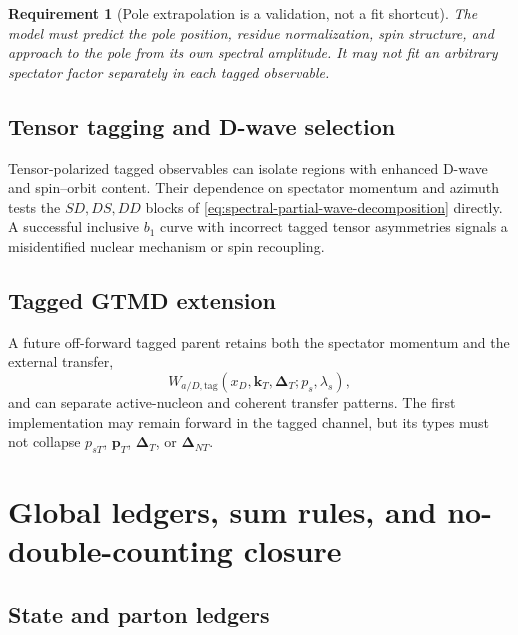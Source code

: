 \documentclass[11pt]{article}
\newtheorem{requirement}[definition]{Requirement}
\newcommand{\kT}{\bm{k}_{T}}
\newcommand{\pT}{\bm{p}_{T}}
\newcommand{\DT}{\bm{\Delta}_{T}}
\newcommand{\DNT}{\bm{\Delta}_{N T}}
\newcommand{\tagg}{\mathrm{tag}}
\begin{document}
\begin{requirement}[Pole extrapolation is a validation, not a fit shortcut]
\label{req:pole-validation}
The model must predict the pole position, residue normalization, spin
structure, and approach to the pole from its own spectral amplitude.  It may
not fit an arbitrary spectator factor separately in each tagged observable.
\end{requirement}

\subsection{Tensor tagging and D-wave selection}

Tensor-polarized tagged observables can isolate regions with enhanced
D-wave and spin--orbit content.  Their dependence on spectator momentum and
azimuth tests the \(SD,DS,DD\) blocks of
\cref{eq:spectral-partial-wave-decomposition} directly.  A successful
inclusive \(b_1\) curve with incorrect tagged tensor asymmetries signals a
misidentified nuclear mechanism or spin recoupling.

\subsection{Tagged GTMD extension}

A future off-forward tagged parent retains both the spectator momentum and
the external transfer,
\begin{equation}
 W_{a/D,\tagg}
 (x_D,\kT,\DT;p_s,\lambda_s),
\label{eq:tagged-gtmd-parent}
\end{equation}
and can separate active-nucleon and coherent transfer patterns.  The first
implementation may remain forward in the tagged channel, but its types must
not collapse \(p_{sT}\), \(\pT\), \(\DT\), or \(\DNT\).

\section{Global ledgers, sum rules, and no-double-counting closure}
\label{sec:sumrules}

\subsection{State and parton ledgers}
\end{document}
